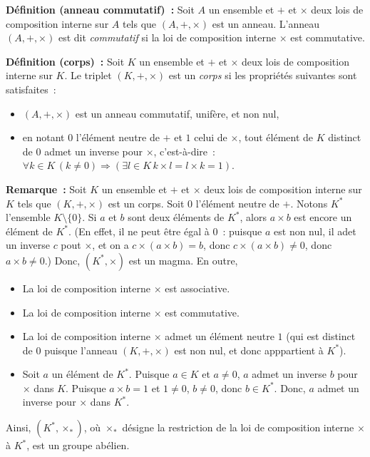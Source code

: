 \noindent\textbf{Définition (anneau commutatif) :} Soit $A$ un ensemble et $+$ et $\times$ deux lois de composition interne sur $A$ tels que $(A, +, \times)$ est un anneau. 
    L'anneau $(A, +, \times)$ est dit \textit{commutatif} si la loi de composition interne $\times$ est commutative.

\medskip

\noindent\textbf{Définition (corps) :} Soit $K$ un ensemble et $+$ et $\times$ deux lois de composition interne sur $K$. 
    Le triplet $(K, +, \times)$ est un \textit{corps} si les propriétés suivantes sont satisfaites : 
    \begin{itemize}[nosep]
        \item $(A,+,\times)$ est un anneau commutatif, unifère, et non nul,
        \item en notant $0$ l'élément neutre de $+$ et $1$ celui de $\times$, tout élément de $K$ distinct de $0$ admet un inverse pour $\times$, c'est-à-dire : $\forall k \in K \, (k \neq 0) \Rightarrow (\exists l \in K \, k \times l = l \times k = 1)$.
    \end{itemize}

\medskip

\noindent\textbf{Remarque :} Soit $K$ un ensemble et $+$ et $\times$ deux lois de composition interne sur $K$ tels que $(K, +, \times)$ est un corps. 
    Soit $0$ l'élément neutre de $+$.
    Notons $K^*$ l'ensemble $K \setminus \lbrace 0 \rbrace$.
    Si $a$ et $b$ sont deux éléments de $K^*$, alors $a \times b$ est encore un élément de $K^*$. 
    (En effet, il ne peut être égal à $0$ : puisque $a$ est non nul, il adet un inverse $c$ pout $\times$, et on a $c \times (a \times b) = b$, donc $c \times (a \times b) \neq 0$, donc $a \times b \neq 0$.)
    Donc, $(K^*, \times)$ est un magma.
    En outre, 
    \begin{itemize}[nosep]
        \item La loi de composition interne $\times$ est associative.
        \item La loi de composition interne $\times$ est commutative.
        \item La loi de composition interne $\times$ admet un élément neutre $1$ (qui est distinct de $0$ puisque l'anneau $(K, +, \times)$ est non nul, et donc apppartient à $K^*$).
        \item Soit $a$ un élément de $K^*$. 
            Puisque $a \in K$ et $a \neq 0$, $a$ admet un inverse $b$ pour $\times$ dans $K$.
            Puisque $a \times b = 1$ et $1 \neq 0$, $b \neq 0$, donc $b \in K^*$.
            Donc, $a$ admet un inverse pour $\times$ dans $K^*$.
    \end{itemize}
    Ainsi, $(K^*, \times_*)$, où $\times_*$ désigne la restriction de la loi de composition interne $\times$ à $K^*$, est un groupe abélien.

